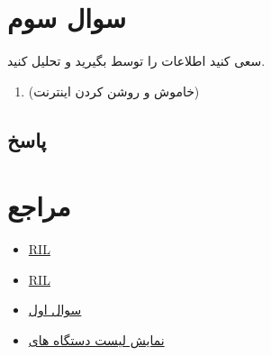 \documentclass{report}
\begin{document}
\section*{سوال سوم}
سعی کنید اطلاعات
 را توسط
 بگیرید و تحلیل کنید.
\begin{enumerate}
	\item 
	 (خاموش و روشن کردن اینترنت)
\end{enumerate}
\subsection*{پاسخ}
\section* {مراجع}
\begin{itemize}
	\item 
	\href{https://www.oreilly.com/library/view/android-hackers-handbook/9781118608647/9781118922255c11.xhtml} {RIL}
	\item 
	\href{https://en.wikipedia.org/wiki/Radio_Interface_Layer} {RIL}
	
	\item 
	\href{https://en.wikipedia.org/wiki/Radio_Interface_Layer} {سوال اول}
	
	\item 
	\href{https://stackoverflow.com/questions/21170392/my-android-device-does-not-appear-in-the-list-of-adb-devices} {نمایش لیست دستگاه های 
	}
	
\end{itemize}
\end{document}
